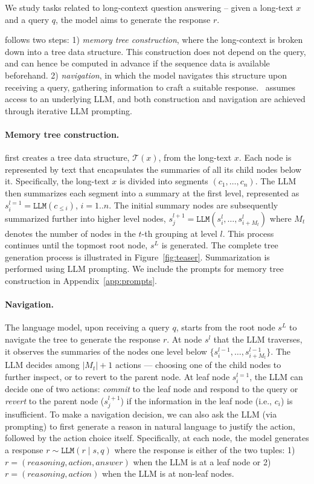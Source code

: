 We study tasks related to long-context question answering -- given a long-text $x$ and a query $q$, the  model aims to generate the response $r$. %

\sysname{} follows two steps: 1) \textit{memory tree construction}, where the long-context is broken down into a tree data structure. This construction does not depend on the query, and can hence be computed in advance if the sequence data is available beforehand.  2) \textit{navigation}, in which the model navigates this structure upon receiving a query, gathering information to craft a suitable response. \sysname{}~assumes access to an underlying LLM, and both construction and navigation are achieved through iterative LLM prompting.

\paragraph{Memory tree construction.}
\sysname{} first creates a tree data structure, $\mathcal{T}(x)$, from the long-text $x$. Each node is represented by text that encapsulates the summaries of all its child nodes below it. Specifically, the long-text $x$ is divided into segments $(c_1, \dots, c_n)$. The LLM then summarizes each segment into a summary at the first level, represented as $s^{l=1}_i = \texttt{LLM}(c_{\leq i})$, $i = 1 .. n$. The initial summary nodes are subsequently summarized further into higher level nodes, $s_j^{l+1} = \texttt{LLM}(s^l_i, \dots, s^l_{i + M_t})$ where $M_t$ denotes the number of nodes in the $t$-th grouping at level $l$. This process continues until the topmost root node, $s^L$ is generated. The complete tree generation process is illustrated in Figure~\ref{fig:teaser}. Summarization is performed using LLM prompting.  We include the prompts for memory tree construction in Appendix~\ref{app:prompts}. %

\paragraph{Navigation.}
The language model, upon receiving a query $q$, starts from the root node $s^L$ to navigate the tree to generate the response $r$. 
At node $s^{l}$ that the LLM traverses, it observes the summaries of the nodes one level below $\{ s^{l-1}_i, \dots, s^{l-1}_{i+M_t} \}$. The LLM decides among $\lvert M_t \rvert + 1$ actions --- choosing one of the child nodes to further inspect, or to revert to the parent node. At leaf node $s^{l=1}_i$, the LLM can decide one of two actions: \textit{commit} to the leaf node and respond to the query or \textit{revert} to the parent node ($s^{l+1}_j$) if the information in the leaf node (i.e., $c_i$) is insufficient.
To make a navigation decision, we can also ask the LLM (via prompting) to 
 first generate a reason in natural language to justify the action, followed by the action choice itself. Specifically, at each node, the model generates a response $r \sim \texttt{LLM}(r \mid s, q)$ where the response is either of the two tuples: 
1) $r = (reasoning, action, answer)$ when the LLM is at a leaf node or 2) $r = (reasoning, action)$ when the LLM is at non-leaf nodes.

